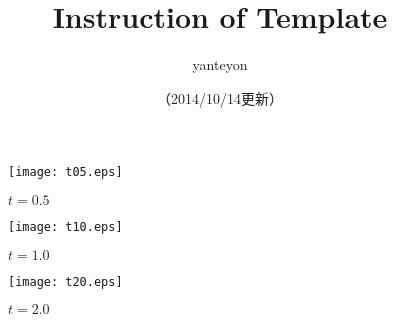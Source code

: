\documentclass[10pt,a4paper]{jsarticle}
\title{Instruction of Template}
\author{yanteyon}
\date{（2014/10/14更新）}
\begin{document}
\begin{figure}[h]
\centering
\texttt{[image: t05.eps]}
\caption{$t=0.5$}
\label{fig:05}
\end{figure}

\begin{figure}[h]
\centering
\texttt{[image: t10.eps]}
\caption{$t=1.0$}
\label{fig:10}
\end{figure}

\begin{figure}[h]
\centering
\texttt{[image: t20.eps]}
\caption{$t=2.0$}
\label{fig:20}
\end{figure}
\end{document}
